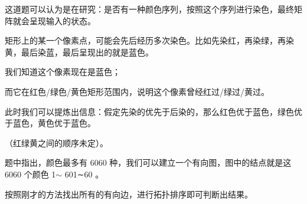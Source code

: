 \documentclass[9pt, b5paaper]{book}
\begin{document}
这道题可以认为是在研究：是否有一种颜色序列，按照这个序列进行染色，最终矩阵就会呈现输入的状态。

矩形上的某一个像素点，可能会先后经历多次染色。比如先染红，再染绿，再染黄，最后染蓝，最后呈现出的就是蓝色。

我们知道这个像素现在是蓝色；

而它在红色/绿色/黄色矩形范围内，说明这个像素曾经红过/绿过/黄过。

此时我们可以提炼出信息：假定先染的优先于后染的，那么红色优于蓝色，绿色优于蓝色，黄色优于蓝色。

（红绿黄之间的顺序未定）。

题中指出，颜色最多有 6060 种，我们可以建立一个有向图，图中的结点就是这 6060 个颜色 1$\sim$ 601∼60 。

按照刚才的方法找出所有的有向边，进行拓扑排序即可判断出结果。
\end{document}
